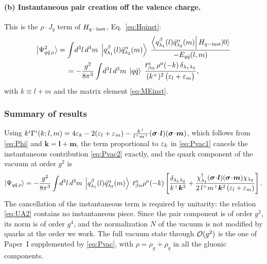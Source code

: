 \paragraph{(b) Instantaneous pair creation off the valence charge.}
\begin{center}
\end{center}
This is the $\rho\cdot J_{q}$ term of $H_{q-{\rm inst}}$, Eq.~\eqref{eq:Hqinst}:
\begin{multline}
\left|\Psi^{2}_{q\bar q\,\rho}\right\rangle=\int\! d^{3}l\,d^{3}m\;
\left|q^{\beta}_{\lambda_{1}}(l)\bar q^{\alpha}_{\lambda_{2}}(m)\right\rangle\;
\frac{\left\langle q^{\beta}_{\lambda_{1}}(l)\bar q^{\alpha}_{\lambda_{2}}(m)\right|H_{q-{\rm inst}}|0\rangle}{-E_{q\bar q}(l,m)}
\\
=-\frac{g^{2}}{8\pi^{3}}\int\!d^{3}l\,d^{3}m\;
\left|q\bar q\right\rangle\;
\frac{t^{a}_{\beta\alpha}\,\rho^{a}(-k)\,\delta_{\lambda_{1}\lambda_{2}}}
{(k^{+})^{2}\,\big(\varepsilon_{l}+\varepsilon_{m}\big)} ,
\label{eq:Pvac2}
\end{multline}
with $k\equiv l+m$ and the matrix element \eqref{eq:MEinst}.

\subsubsection{Summary of results}
\label{sec:sum-vac}

Using
$k^{i}\Gamma^{i}(k;l,m)=4\varepsilon_{k}-2(\varepsilon_{l}+\varepsilon_{m})-\tfrac{k^{+}}{l^{+}m^{+}}(\bm\sigma\!\cdot\!\bm l)(\bm\sigma\!\cdot\!\bm m)$,
which follows from \eqref{eq:Phi} and $\bm k=\bm l+\bm m$, the term proportional to $\varepsilon_{k}$ in
\eqref{eq:Pvac1} cancels the instantaneous contribution \eqref{eq:Pvac2} exactly, and the quark
component of the vacuum at order $g^{2}$ is
\begin{equation}
\left|\Psi_{q\bar q\,\rho}\right\rangle=-\frac{g^{2}}{8\pi^{3}}\int\!d^{3}l\,d^{3}m\;
\left|q^{\beta}_{\lambda_{1}}(l)\bar q^{\alpha}_{\lambda_{2}}(m)\right\rangle\;
t^{a}_{\beta\alpha}\rho^{a}(-k)\left[\frac{\delta_{\lambda_{1}\lambda_{2}}}{k^{+}\bm k^{2}}
+\frac{\chi^{\dagger}_{\lambda_{1}}(\bm\sigma\!\cdot\!\bm l)(\bm\sigma\!\cdot\!\bm m)\chi_{\lambda_{2}}}
{2\,l^{+}m^{+}\bm k^{2}\,(\varepsilon_{l}+\varepsilon_{m})}\right].
\label{eq:Pvac}
\end{equation}
The cancellation of the instantaneous term is required by unitarity: the relation
\eqref{eq:UA2} contains no instantaneous piece. Since the pair component is of order $g^{2}$, its
norm is of order $g^{4}$, and the normalization $N$ of the vacuum is not modified by quarks at the
order we work. The full vacuum state through $\mathcal{O}(g^{2})$ is the one of Paper~I supplemented by
\eqref{eq:Pvac}, with $\rho=\rho_{g}+\rho_{q}$ in all the gluonic components.

